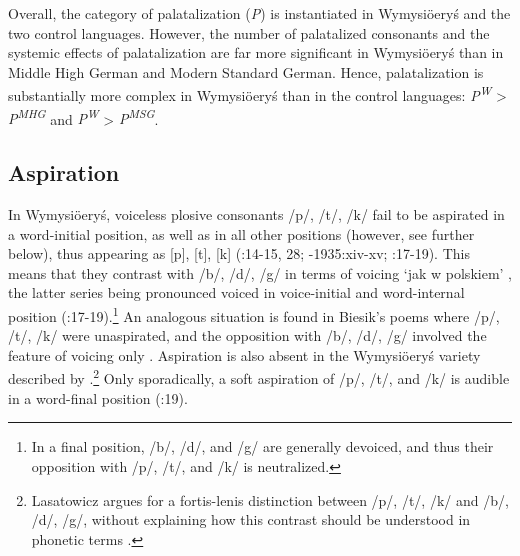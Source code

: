 \documentclass[output=paper]{langscibook}
\begin{document}
Overall, the category of palatalization (\textit{P}) is instantiated in Wymysiöeryś and the two control languages. However, the number of palatalized consonants and the systemic effects of palatalization are far more significant in Wymysiöeryś than in Middle High German and Modern Standard German. Hence, palatalization is substantially more complex in Wymysiöeryś than in the control languages: \textit{P\textsuperscript{W}} > \textit{P\textsuperscript{MHG}} and \textit{P\textsuperscript{W}} > \textit{P\textsuperscript{MSG}}.

\subsection{ Aspiration}\label{sec:wymsorys:3.10}

In Wymysiöeryś, voiceless plosive consonants /p/, /t/, /k/ fail to be aspirated in a word-initial position, as well as in all other positions (however, see further below), thus appearing as [p], [t], [k] (\citealt{Kleczkowski1920}:14-15, 28; \citealt{Mojmir1930}-1935:xiv-xv; \citealt{AndrasonKról2016}:17-19). This means that they contrast with /b/, /d/, /g/ in terms of voicing ‘jak w polskiem’ \citep[28]{Kleczkowski1920}, the latter series being pronounced voiced in voice-initial and word-internal position (\citealt{AndrasonKról2016}:17-19).\footnote{In a final position, /b/, /d/, and /g/ are generally devoiced, and thus their opposition with /p/, /t/, and /k/ is neutralized.} An analogous situation is found in Biesik’s poems where /p/, /t/, /k/ were unaspirated, and the opposition with /b/, /d/, /g/ involved the feature of voicing only \citep[399-409]{Wicherkiewicz2003}. Aspiration is also absent in the Wymysiöeryś variety described by \citet[42]{Lasatowicz1992}.\footnote{Lasatowicz argues for a fortis-lenis distinction between /p/, /t/, /k/ and /b/, /d/, /g/, without explaining how this contrast should be understood in phonetic terms \citep[42]{Lasatowicz1992}.} Only sporadically, a soft aspiration of /p/, /t/, and /k/ is audible in a word-final position (\citealt{AndrasonKról2016}:19).
\end{document}
